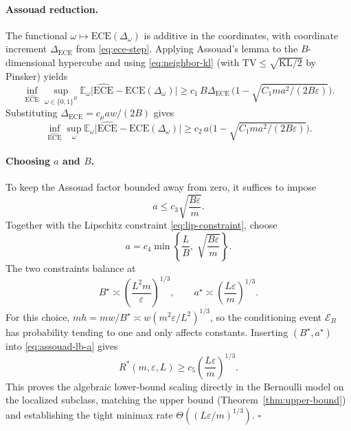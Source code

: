 \documentclass{article}
\newcommand{\ECE}{\mathrm{ECE}}
\newcommand{\Lip}{L}
\newcommand{\errrate}{\varepsilon}
\newcommand{\nsamples}{m}
\newcommand{\calmap}{\Delta}
\newcommand{\scoredist}{\mu}
\providecommand{\E}{}
\renewcommand{\E}{\mathbb{E}}
\providecommand{\KL}{}
\renewcommand{\KL}{\mathrm{KL}}
\newcommand{\TV}{\mathrm{TV}}
\theoremstyle{definition}
\begin{document}
\paragraph{Assouad reduction.} The functional $\omega \mapsto \ECE(\calmap_\omega)$ is additive in the coordinates, with coordinate increment $\Delta_{\ECE}$ from \eqref{eq:ece-step}. Applying Assouad's lemma to the $B$-dimensional hypercube and using \eqref{eq:neighbor-kl} (with $\TV \le \sqrt{\KL/2}$ by Pinsker) yields
\[
\inf_{\widehat{\ECE}} \sup_{\omega \in \{0,1\}^B}
\E_\omega \big|\widehat{\ECE} - \ECE(\calmap_\omega)\big|
\ge c_1\, B \Delta_{\ECE}\,
\Big(1 - \sqrt{C_1 \nsamples a^2/(2B\errrate)}\Big).
\]
Substituting $\Delta_{\ECE}=c_\scoredist aw/(2B)$ gives
\begin{equation}
\label{eq:assouad-lb-a}
\inf_{\widehat{\ECE}} \sup_{\omega}
\E_\omega \big|\widehat{\ECE} - \ECE(\calmap_\omega)\big|
\ge c_2\, a
\Big(1 - \sqrt{C_1 \nsamples a^2/(2B\errrate)}\Big).
\end{equation}

\paragraph{Choosing $a$ and $B$.} To keep the Assouad factor bounded away from zero, it suffices to impose
\begin{equation}
\label{eq:variance-constraint}
a \le c_3 \sqrt{\frac{B\errrate}{\nsamples}}.
\end{equation}
Together with the Lipschitz constraint \eqref{eq:lip-constraint}, choose
\[
a = c_4 \min\!\left\{\frac{\Lip}{B},\; \sqrt{\frac{B\errrate}{\nsamples}}\right\}.
\]
The two constraints balance at
\[
B^\star \asymp \left(\frac{\Lip^2 \nsamples}{\errrate}\right)^{1/3},
\qquad
a^\star \asymp \left(\frac{\Lip\errrate}{\nsamples}\right)^{1/3}.
\]
For this choice, $\nsamples h = \nsamples w/B^\star \asymp w(\nsamples^2\errrate/\Lip^2)^{1/3}$, so the conditioning event $\mathcal{E}_B$ has probability tending to one and only affects constants. Inserting $(B^\star,a^\star)$ into \eqref{eq:assouad-lb-a} gives
\[
R^*(\nsamples,\errrate,\Lip)
\ge c_5 \left(\frac{\Lip\errrate}{\nsamples}\right)^{1/3}.
\]
This proves the algebraic lower-bound scaling directly in the Bernoulli model on the localized subclass, matching the upper bound (Theorem~\ref{thm:upper-bound}) and establishing the tight minimax rate $\Theta((\Lip\errrate/\nsamples)^{1/3})$. $\square$

\end{document}
